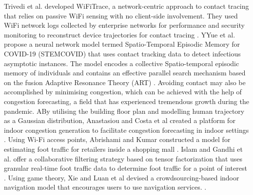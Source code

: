 \documentclass[acmtog]{acmart}
\begin{document}
Trivedi et al. developed WiFiTrace, a network-centric approach to contact tracing that relies on passive WiFi sensing with no client-side involvement. They used WiFi network logs collected by enterprise networks for performance and security monitoring to reconstruct device trajectories for contact tracing \cite{trivedi2021wifitrace}. YYue et al. propose a neural network model termed Spatio-Temporal Episodic Memory for COVID-19 (STEMCOVID) that uses contact tracking data to detect infectious asymptotic instances. The model encodes a collective Spatio-temporal episodic memory of individuals and contains an effective parallel search mechanism based on the fusion Adaptive Resonance Theory (ART) \cite{hu2020silent}. Avoiding contact may also be accomplished by minimising congestion, which can be achieved with the help of congestion forecasting, a field that has experienced tremendous growth during the pandemic. ABy utilising the building floor plan and modelling human trajectory as a Gaussian distribution, Anastasiou and Costa et al created a platform for indoor congestion generation to facilitate congestion forecasting in indoor settings \cite{anastasiou2021epicgen}. Using Wi-Fi access points, Abrishami and Kumar constructed a model for estimating foot traffic for retailers inside a shopping mall \cite{abrishami2018using}. Islam and Gandhi et al. offer a collaborative filtering strategy based on tensor factorization that uses granular real-time foot traffic data to determine foot traffic for a point of interest \cite{islam2021spatiotemporal}. Using game theory, Xie and Luan et al devised a crowdsourcing-based indoor navigation model that encourages users to use navigation services. \cite{xie2021game}.
\end{document}
